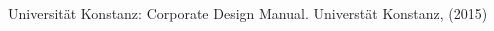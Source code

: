 \documentclass[11pt, rgb]{scrreprt}
\begin{document}







\begin{thebibliography}{[MB91a]}

\normalsize
\sffamily

\setlength{\itemsep}{6pt}

Universität Konstanz: Corporate Design Manual.
Universtät Konstanz, (2015)

\end{thebibliography}

\end{document}
